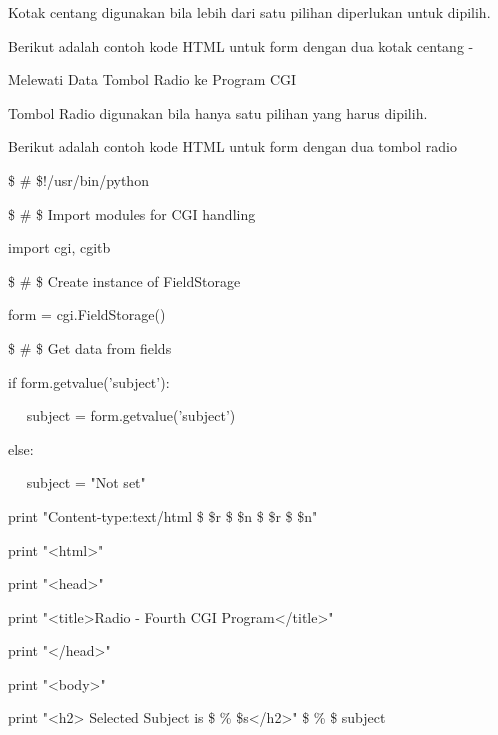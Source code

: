 \begin{12pt}
\begin{12pt}
\noindent 
Kotak centang digunakan bila lebih dari satu pilihan diperlukan untuk dipilih. \par
\vspace{12pt}
\noindent 
Berikut adalah contoh kode HTML untuk form dengan dua kotak centang - \par
\vspace{12pt}
\noindent 
Melewati Data Tombol Radio ke Program CGI \par
\vspace{12pt}
\noindent 
Tombol Radio digunakan bila hanya satu pilihan yang harus dipilih. \par
\vspace{12pt}
\noindent 
Berikut adalah contoh kode HTML untuk form dengan dua tombol radio  \par
\vspace{12pt}
\vspace{12pt}
\noindent 
 \$  \#  \$!/usr/bin/python \par
\vspace{12pt}
\noindent 
 \$  \#  \$ Import modules for CGI handling  \par
\noindent 
import cgi, cgitb  \par
\vspace{12pt}
\noindent 
 \$  \#  \$ Create instance of FieldStorage  \par
\noindent 
form = cgi.FieldStorage()  \par
\vspace{12pt}
\noindent 
 \$  \#  \$ Get data from fields \par
\noindent 
if form.getvalue('subject'): \par
\noindent 
~~ subject = form.getvalue('subject') \par
\noindent 
else: \par
\noindent 
~~ subject = "Not set" \par
\vspace{12pt}
\noindent 
print "Content-type:text/html \$  \setminus  \$r \$  \setminus  \$n \$  \setminus  \$r \$  \setminus  \$n" \par
\noindent 
print "<html>" \par
\noindent 
print "<head>" \par
\noindent 
print "<title>Radio - Fourth CGI Program</title>" \par
\noindent 
print "</head>" \par
\noindent 
print "<body>" \par
\noindent 
print "<h2> Selected Subject is  \$  \%  \$s</h2>"  \$  \%  \$ subject \par

\end{12pt}
\end{12pt}
